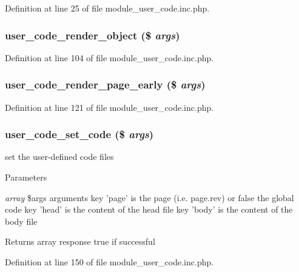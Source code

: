 Definition at line 25 of file module\_\-user\_\-code.inc.php.

\hypertarget{module__user__code_8inc_8php_ae2a601394f96c69bb105d73774d2aa29}{
\subsubsection[{user\_\-code\_\-render\_\-object}]{\setlength{\rightskip}{0pt plus 5cm}user\_\-code\_\-render\_\-object (\$ {\em args})}}
\label{module__user__code_8inc_8php_ae2a601394f96c69bb105d73774d2aa29}


Definition at line 104 of file module\_\-user\_\-code.inc.php.

\hypertarget{module__user__code_8inc_8php_ac616caa2e8476e976c51e8b833e6d55b}{
\subsubsection[{user\_\-code\_\-render\_\-page\_\-early}]{\setlength{\rightskip}{0pt plus 5cm}user\_\-code\_\-render\_\-page\_\-early (\$ {\em args})}}
\label{module__user__code_8inc_8php_ac616caa2e8476e976c51e8b833e6d55b}


Definition at line 121 of file module\_\-user\_\-code.inc.php.

\hypertarget{module__user__code_8inc_8php_a788372f1e959532d09dceb63209507cb}{
\subsubsection[{user\_\-code\_\-set\_\-code}]{\setlength{\rightskip}{0pt plus 5cm}user\_\-code\_\-set\_\-code (\$ {\em args})}}
\label{module__user__code_8inc_8php_a788372f1e959532d09dceb63209507cb}
set the user-\/defined code files


\begin{DoxyParams}{Parameters}
\item[{\em array}]\$args arguments key 'page' is the page (i.e. page.rev) or false the global code key 'head' is the content of the head file key 'body' is the content of the body file \end{DoxyParams}
\begin{DoxyReturn}{Returns}
array response true if successful 
\end{DoxyReturn}


Definition at line 150 of file module\_\-user\_\-code.inc.php.

